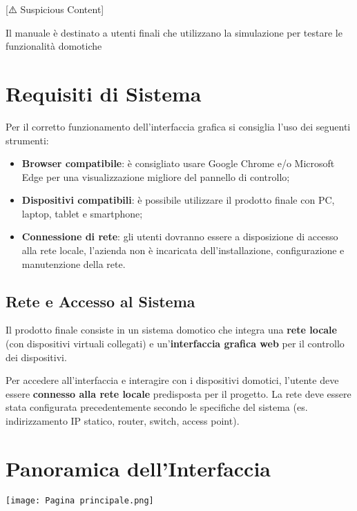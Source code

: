 [⚠️ Suspicious Content] \documentclass[a4paper,12pt]{article}
\begin{document}
Il manuale è destinato a utenti finali che utilizzano la simulazione per testare le funzionalità domotiche

\section{Requisiti di Sistema}

Per il corretto funzionamento dell’interfaccia grafica si consiglia l’uso dei seguenti strumenti:

\begin{itemize}
  \item \textbf{Browser compatibile}: è consigliato usare Google Chrome e/o Microsoft Edge per una visualizzazione migliore del pannello di controllo;
  \item \textbf{Dispositivi compatibili}: è possibile utilizzare il prodotto finale con PC, laptop, tablet e smartphone;
  \item \textbf{Connessione di rete}: gli utenti dovranno essere a disposizione di accesso alla rete locale, l'azienda non è incaricata dell'installazione, configurazione e manutenzione della rete.
\end{itemize}

\subsection{ Rete e Accesso al Sistema}

Il prodotto finale consiste in un sistema domotico che integra una \textbf{rete locale} (con dispositivi virtuali collegati) e un’\textbf{interfaccia grafica web} per il controllo dei dispositivi.

Per accedere all’interfaccia e interagire con i dispositivi domotici, l’utente deve essere \textbf{connesso alla rete locale} predisposta per il progetto. La rete deve essere stata configurata precedentemente secondo le specifiche del sistema (es. indirizzamento IP statico, router, switch, access point).

\hspace{20 mm}

\section{Panoramica dell’Interfaccia}

\hspace{-10 mm} \texttt{[image: Pagina principale.png]}
\vspace{5 mm}
\end{document}
